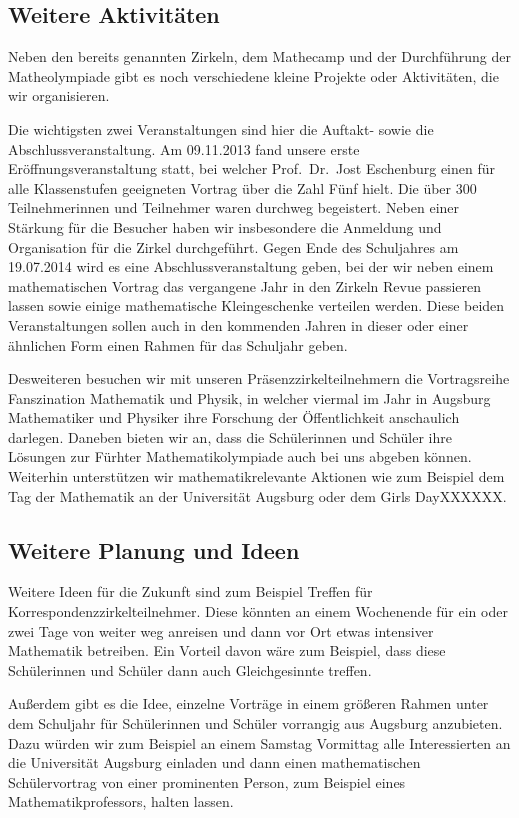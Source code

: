 \documentclass[12pt]{zettel}
\begin{document}
\subsection{Weitere Aktivitäten}

Neben den bereits genannten Zirkeln, dem Mathecamp und der Durchführung
der Matheolympiade gibt es noch verschiedene kleine Projekte oder
Aktivitäten, die wir organisieren.

Die wichtigsten zwei Veranstaltungen sind hier die Auftakt- sowie die
Abschlussveranstaltung. Am 09.11.2013 fand unsere erste
Eröffnungsveranstaltung statt, bei welcher Prof.~Dr.~Jost Eschenburg
einen für alle Klassenstufen geeigneten Vortrag über die Zahl Fünf
hielt. Die über 300 Teilnehmerinnen und Teilnehmer waren durchweg
begeistert. Neben einer Stärkung für die Besucher haben wir insbesondere
die Anmeldung und Organisation für die Zirkel durchgeführt. Gegen Ende
des Schuljahres am 19.07.2014 wird es eine Abschlussveranstaltung geben,
bei der wir neben einem mathematischen Vortrag das vergangene Jahr in
den Zirkeln Revue passieren lassen sowie einige mathematische
Kleingeschenke verteilen werden. Diese beiden Veranstaltungen sollen
auch in den kommenden Jahren in dieser oder einer ähnlichen Form einen
Rahmen für das Schuljahr geben.

Desweiteren besuchen wir mit unseren Präsenzzirkelteilnehmern die
Vortragsreihe Fanszination Mathematik und Physik, in welcher viermal im
Jahr in Augsburg Mathematiker und Physiker ihre Forschung der
Öffentlichkeit anschaulich darlegen. Daneben bieten wir an, dass die
Schülerinnen und Schüler ihre Lösungen zur Fürhter Mathematikolympiade
auch bei uns abgeben können. Weiterhin unterstützen wir
mathematikrelevante Aktionen wie zum Beispiel dem Tag der Mathematik an
der Universität Augsburg oder dem Girls DayXXXXXX.

\subsection{Weitere Planung und Ideen}

Weitere Ideen für die Zukunft sind zum Beispiel Treffen für
Korrespondenzzirkelteilnehmer. Diese könnten an einem Wochenende für ein
oder zwei Tage von weiter weg anreisen und dann vor Ort etwas intensiver
Mathematik betreiben. Ein Vorteil davon wäre zum Beispiel, dass diese
Schülerinnen und Schüler dann auch Gleichgesinnte treffen.

Außerdem gibt es die Idee, einzelne Vorträge in einem größeren Rahmen
unter dem Schuljahr für Schülerinnen und Schüler vorrangig aus Augsburg
anzubieten. Dazu würden wir zum Beispiel an einem Samstag Vormittag alle
Interessierten an die Universität Augsburg einladen und dann einen
mathematischen Schülervortrag von einer prominenten Person, zum Beispiel
eines Mathematikprofessors, halten lassen.
\end{document}
